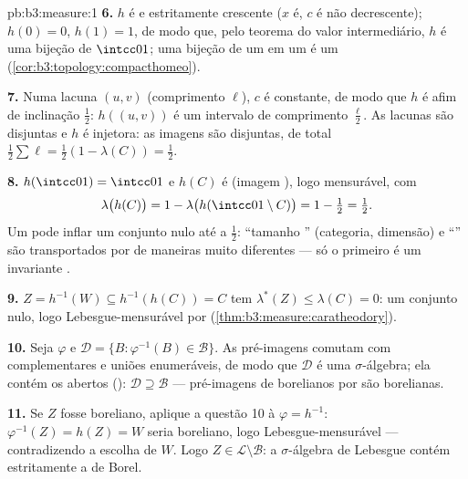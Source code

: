 \begin{solution}{pb:b3:measure:1}
\textbf{6.} $h$ é  e estritamente crescente ($x$ é,
$c$ é não decrescente); $h(0) = 0$, $h(1) = 1$, de modo que, pelo
teorema do valor intermediário, $h$ é uma bijeção  de
$\intcc01$; uma bijeção  de um  em um  é um 
(\cref{cor:b3:topology:compacthomeo}).

\textbf{7.} Numa lacuna $(u, v)$ (comprimento $\ell$), $c$ é constante,
de modo que $h$ é afim de inclinação $\frac12$: $h((u,v))$ é um
intervalo de comprimento $\frac\ell2$. As lacunas são disjuntas e $h$
é injetora: as imagens são disjuntas, de  total
$\frac12\sum\ell = \frac12(1 - \lambda(C)) = \frac12$.

\textbf{8.} $h(\intcc01) = \intcc01$ e $h(C)$ é 
(imagem ), logo mensurável, com
\[
\lambda\bigl(h(C)\bigr) = 1 -
\lambda\bigl(h(\intcc01\setminus C)\bigr) = 1 - \tfrac12 =
\tfrac12 .
\]
Um  pode inflar um conjunto nulo até a  $\frac12$:
``tamanho '' (categoria, dimensão) e ``'' são
transportados por  de maneiras muito diferentes --- só o
primeiro é um invariante .

\textbf{9.} $Z = h^{-1}(W) \subseteq h^{-1}(h(C)) = C$ tem
$\lambda^*(Z) \leq \lambda(C) = 0$: um conjunto nulo, logo
Lebesgue-mensurável por 
(\cref{thm:b3:measure:caratheodory}).

\textbf{10.} Seja $\varphi$  e $\mathcal D = \{B
: \varphi^{-1}(B) \in \mathcal B\}$. As pré-imagens comutam com
complementares e uniões enumeráveis, de modo que $\mathcal D$ é uma
$\sigma$-álgebra; ela contém os abertos ():
$\mathcal D \supseteq \mathcal B$ --- pré-imagens de borelianos
por  são borelianas.

\textbf{11.} Se $Z$ fosse boreliano, aplique a questão 10 à
 $\varphi = h^{-1}$: $\varphi^{-1}(Z) = h(Z) = W$
seria boreliano, logo Lebesgue-mensurável --- contradizendo a
escolha de $W$. Logo $Z \in \mathcal L \setminus \mathcal B$:
a $\sigma$-álgebra de Lebesgue contém estritamente a de Borel.


\end{solution}
